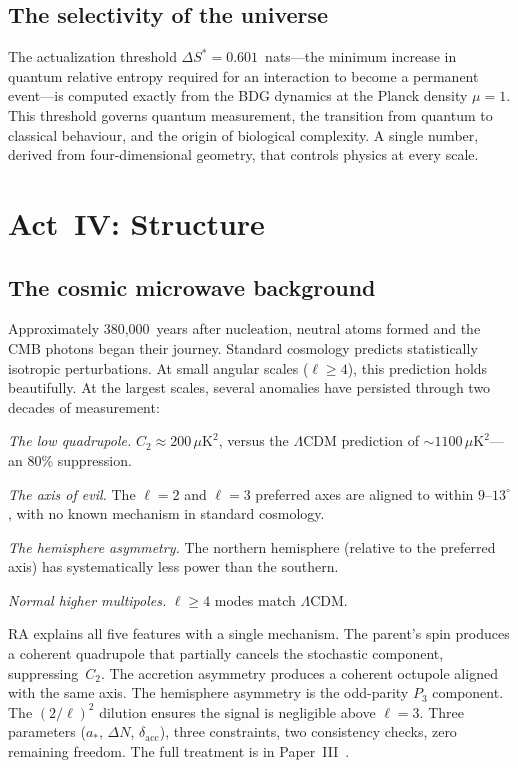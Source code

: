 \documentclass[11pt,a4paper]{article}
\theoremstyle{plain}
\theoremstyle{definition}
\theoremstyle{remark}
\begin{document}
\subsection{The selectivity of the universe}\label{sec:selectivity}

The actualization threshold
$\Delta S^* = 0.601$~nats---the minimum increase in quantum relative
entropy required for an interaction to become a permanent event---is
computed exactly from the BDG dynamics at the Planck density $\mu = 1$.
This threshold governs quantum measurement, the transition from quantum
to classical behaviour, and the origin of biological complexity.  A
single number, derived from four-dimensional geometry, that controls
physics at every scale.

\section{Act~IV: Structure}\label{sec:act4}

\subsection{The cosmic microwave background}\label{sec:cmb}

Approximately 380,000~years after nucleation, neutral atoms formed and
the CMB photons began their journey.  Standard cosmology predicts
statistically isotropic perturbations.  At small angular scales
($\ell \geq 4$), this prediction holds beautifully.  At the largest
scales, several anomalies have persisted through two decades of
measurement:

\emph{The low quadrupole.}  $C_2 \approx 200\,\mu\mathrm{K}^2$, versus
the $\Lambda$CDM prediction of $\sim\!1100\,\mu\mathrm{K}^2$---an 80\%
suppression.

\emph{The axis of evil.}  The $\ell = 2$ and $\ell = 3$ preferred axes
are aligned to within $9$--$13^\circ$, with no known mechanism in
standard cosmology.

\emph{The hemisphere asymmetry.}  The northern hemisphere (relative to
the preferred axis) has systematically less power than the southern.

\emph{Normal higher multipoles.}  $\ell \geq 4$ modes match $\Lambda$CDM.

RA explains all five features with a single mechanism.  The parent's spin
produces a coherent quadrupole that partially cancels the stochastic
component, suppressing~$C_2$.  The accretion asymmetry produces a
coherent octupole aligned with the same axis.  The hemisphere asymmetry
is the odd-parity $P_3$ component.  The $(2/\ell)^2$ dilution ensures
the signal is negligible above $\ell = 3$.  Three parameters ($a_*$,
$\Delta N$, $\delta_{\mathrm{acc}}$), three constraints, two consistency
checks, zero remaining freedom.  The full treatment is in
Paper~III~\cite{P3}.
\end{document}
